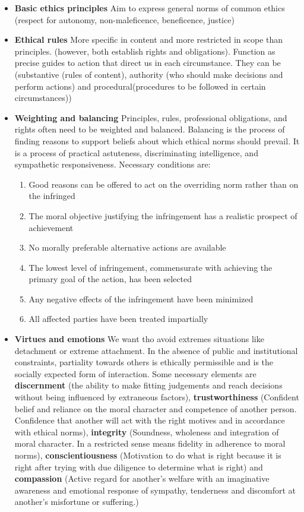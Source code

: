 \begin{itemize}
    \item \textbf{Basic ethics principles} \ra Aim to express general norms of common ethics (respect for autonomy, non-maleficence, beneficence, justice)
    
    \item \textbf{Ethical rules} \ra More specific in content and more restricted in scope than principles. (however, both establish rights and obligations). Function as precise guides to action that direct us in each circumstance. They can be (substantive (rules of content), authority (who should make decisions and perform actions) and procedural(procedures to be followed in certain circumstances))
    
    \item \textbf{Weighting and balancing} \ra Principles, rules, professional
obligations, and rights often
need to be weighted and
balanced.
Balancing is the process
of finding reasons to
support beliefs about
which ethical norms
should prevail. It is a process of practical astuteness, discriminating intelligence, and sympathetic
responsiveness. Necessary conditions are:
\begin{enumerate}
    \item  Good reasons can be offered to act on the overriding norm
rather than on the infringed
\item The moral objective justifying the infringement has a realistic
prospect of achievement

\item No morally preferable alternative actions are available
\item  The lowest level of infringement, commensurate with achieving
the primary goal of the action, has been selected
\item  Any negative effects of the infringement have been minimized
\item All affected parties have been treated impartially
\end{enumerate}

    \item \textbf{Virtues and emotions} \ra We want tho avoid extremes situations like detachment or extreme attachment. In the absence of public and institutional constraints, partiality towards others is
ethically permissible and is the socially expected form of interaction. Some necessary elements are \textbf{discernment} (the ability to make fitting judgements and reach decisions without being influenced by extraneous factors), \textbf{trustworthiness} (Confident belief and reliance on the moral character and competence of another
person. Confidence that another will act with the right motives and in accordance with
ethical norms), \textbf{integrity} (Soundness, wholeness and integration of moral character. In a restricted sense means
fidelity in adherence to moral norms), \textbf{conscientiousness} (Motivation to do what is right because it is right after trying with due diligence to
determine what is right) and \textbf{compassion} (Active regard for another’s welfare with an imaginative awareness and emotional
response of sympathy, tenderness and discomfort at another’s misfortune or suffering.)
\end{itemize}

